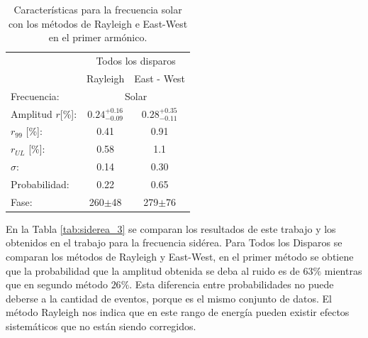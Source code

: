     \begin{table}[H]
        \begin{small}
            \begin{center}
                \begin{tabular}[c]{l|c|c|}
                    \cline{2-3}         & \multicolumn{2}{c|}{Todos los disparos} \\ \cline{2-3}
                                        & Rayleigh                      & East - West            \\\hline
\multicolumn{1}{|l|}{Frecuencia:}             &\multicolumn{2}{c|}{Solar}        \\
\multicolumn{1}{|l|}{Amplitud $r$[\%]:} & $0.24^{+0.16}_{-0.09}$        & $0.28^{+0.35}_{-0.11}$ \\
\multicolumn{1}{|l|}{$r_{99}$ [\%]:   } & 0.41                          & 0.91       \\
\multicolumn{1}{|l|}{$r_{UL}$ [\%]:   } & 0.58                          & 1.1       \\
\multicolumn{1}{|l|}{$\sigma$:        } & 0.14                          & 0.30          \\\hline
\multicolumn{1}{|l|}{Probabilidad:    } & 0.22                          & 0.65          \\
\multicolumn{1}{|l|}{Fase:            } & 260$\pm$48                    & 279$\pm$76    \\\hline
                \end{tabular}
            \end{center}
        \end{small}
        \caption{Características para la frecuencia solar con los métodos de Rayleigh  e East-West en el primer armónico.}
        \label{tab:solar_3}
    \end{table}
    
    En la Tabla \ref{tab:siderea_3} se comparan los resultados de este trabajo y los obtenidos en el trabajo \cite{Aab_2020} para la frecuencia sidérea. Para Todos los Disparos se comparan los métodos de Rayleigh y East-West, en el primer método se obtiene que la probabilidad que la amplitud obtenida se deba al ruido es de $6
    3\%$ mientras que en segundo método $26\%$. Esta diferencia entre probabilidades no puede deberse a la cantidad de eventos, porque es el mismo conjunto de datos. El método Rayleigh nos indica que en este rango de energía pueden existir efectos sistemáticos que no están siendo corregidos.


